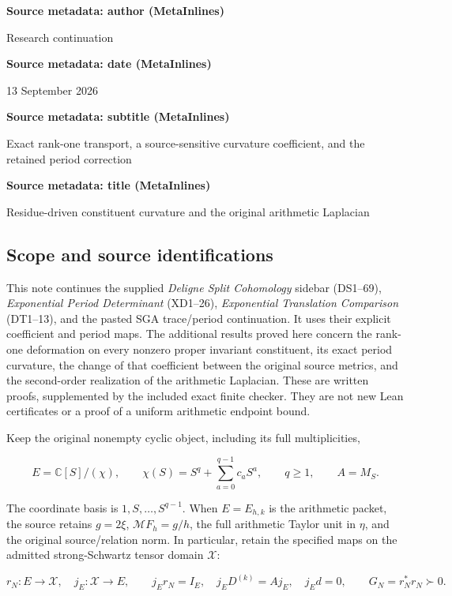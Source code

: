 \textbf{Source metadata: author (MetaInlines)}

Research continuation

\textbf{Source metadata: date (MetaInlines)}

13 September 2026

\textbf{Source metadata: subtitle (MetaInlines)}

Exact rank-one transport, a source-sensitive curvature coefficient, and the retained period correction

\textbf{Source metadata: title (MetaInlines)}

Residue-driven constituent curvature and the original arithmetic Laplacian

\subsection{Scope and source identifications}\label{endpoint-residue_original--scope-and-source-identifications}

This note continues the supplied \emph{Deligne Split Cohomology} sidebar (DS1--69), \emph{Exponential Period Determinant} (XD1--26), \emph{Exponential Translation Comparison} (DT1--13), and the pasted SGA trace/period continuation. It uses their explicit coefficient and period maps. The additional results proved here concern the rank-one deformation on every nonzero proper invariant constituent, its exact period curvature, the change of that coefficient between the original source metrics, and the second-order realization of the arithmetic Laplacian. These are written proofs, supplemented by the included exact finite checker. They are not new Lean certificates or a proof of a uniform arithmetic endpoint bound.

Keep the original nonempty cyclic object, including its full multiplicities,

\[
E=\mathbb C[S]/(\chi),\qquad
\chi(S)=S^q+\sum_{a=0}^{q-1}c_aS^a,\qquad q\geq1,
\qquad A=M_S.
\tag{RC1}
\]

The coordinate basis is \(1,S,\ldots,S^{q-1}\). When \(E=E_{h,k}\) is the arithmetic packet, the source retains \(g=2\xi\), \(\mathcal MF_h=g/h\), the full arithmetic Taylor unit in \(\eta\), and the original source/relation norm. In particular, retain the specified maps on the admitted strong-Schwartz tensor domain \(\mathscr X\):

\[
r_N:E\longrightarrow\mathscr X,\quad j_E:\mathscr X\longrightarrow E,
\qquad j_Er_N=I_E,\quad j_ED^{(k)}=Aj_E,\quad j_Ed=0,
\qquad G_N=r_N^*r_N\succ0.
\tag{RC2}
\]

